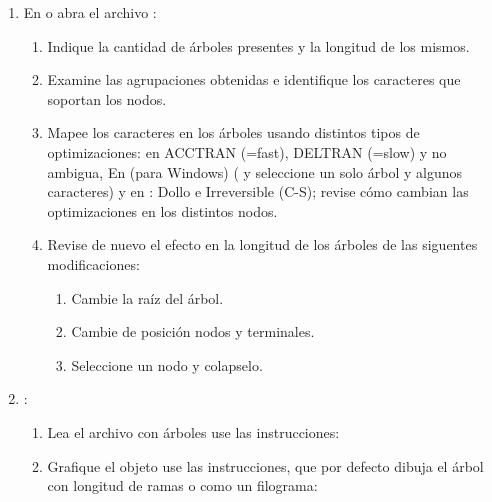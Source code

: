 \begin{enumerate}
	\item En  o  abra el archivo :
	\begin{enumerate}
		\item Indique la cantidad de \'arboles presentes y la longitud de los mismos.
		\item Examine las agrupaciones obtenidas e identifique los caracteres que soportan los nodos.
		\item Mapee los caracteres en los \'arboles usando distintos tipos de optimizaciones: en  ACCTRAN (=fast), DELTRAN (=slow) y no ambigua, En  (para Windows) ( y seleccione un solo \'arbol y algunos caracteres) y en : Dollo e Irreversible (C-S); revise c\'omo cambian las optimizaciones en los distintos nodos.
		\item Revise de nuevo el efecto en la longitud de los \'arboles de las siguentes modificaciones:
		\begin{enumerate}
			\item Cambie la ra\'iz del \'arbol.
			\item Cambie de posici\'on nodos y terminales.
			\item Seleccione un nodo y colapselo.
		\end{enumerate}
	\end{enumerate}

	

	\item \En {}:
	\begin{enumerate}

		\item Lea el archivo con \'arboles  use las instrucciones:
		\item Grafique el objeto  use las instrucciones, que por defecto dibuja el \'arbol con longitud de ramas o como un filograma:


\end{enumerate}
\end{enumerate}
